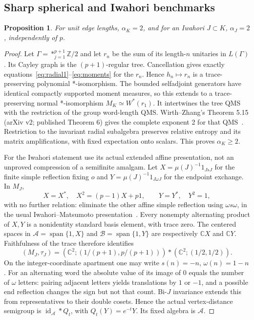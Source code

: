 \documentclass[11pt]{article}
\newtheorem{proposition}[definition]{Proposition}
\theoremstyle{remark}\newtheorem{remark}[definition]{Remark}
\newcommand{\id}{\operatorname{id}}
\newcommand{\C}{\mathbb{C}}
\newcommand{\Z}{\mathbb{Z}}
\begin{document}
\subsection{Sharp spherical and Iwahori benchmarks}
\begin{proposition}\label{prop:sharp}
For unit edge lengths, $\alpha_K=2$, and for an Iwahori $J\subset K$,
$\alpha_J=2$, independently of $p$.
\end{proposition}
\begin{proof}
Let $\Gamma=*_{j=1}^{p+1}\Z/2$ and let $r_n$ be the sum of its length-$n$
unitaries in $L(\Gamma)$. Its Cayley graph is the $(p+1)$-regular tree.
Cancellation gives exactly equations~\eqref{eq:radial1}--\eqref{eq:moments}
for the $r_n$. Hence $h_n\mapsto r_n$ is a trace-preserving polynomial
*-isomorphism. The bounded selfadjoint generators have identical compactly
supported moment measures, so this extends to a trace-preserving normal
*-isomorphism $M_K\simeq W^*(r_1)$. It intertwines the tree QMS with the
restriction of the group word-length QMS. Wirth--Zhang's Theorem 5.15
(arXiv v2; published Theorem 6) gives the complete exponent 2 for that
QMS~\cite{WirthZhang2021}. Restriction to the invariant radial subalgebra
preserves relative entropy and its matrix amplifications, with fixed
expectation onto scalars. This proves $\alpha_K\geq2$.

For the Iwahori statement use its actual extended affine presentation,
not an unproved compression of a semifinite amalgam. Let
$X=\mu(J)^{-1}1_{JsJ}$ for the finite simple reflection fixing $o$ and
$Y=\mu(J)^{-1}1_{J\omega J}$ for the endpoint exchange. In $M_J$,
\[
 X=X^*,\quad X^2=(p-1)X+p1,\qquad Y=Y^*,\quad Y^2=1,
\]
with no further relation: eliminate the other affine simple reflection
using $\omega s\omega$, in the usual Iwahori--Matsumoto presentation~\cite[Sections 7.1--7.2, relations after Lemma 7.2.1]{HainesKottwitzPrasad2010}.
Every nonempty alternating product of $X,Y$ is a nonidentity standard
basis element, with trace zero. The centered spaces in
$\mathcal A=\operatorname{span}\{1,X\}$ and
$\mathcal B=\operatorname{span}\{1,Y\}$ are respectively $\C X$ and
$\C Y$. Faithfulness of the trace therefore identifies
\[
 (M_J,\tau_J)=
 (\C^2;(1/(p+1),p/(p+1))) * (\C^2;(1/2,1/2)).
\]
On the integer-coordinate apartment one may write
$s(n)=-n$, $\omega(n)=1-n$. For an alternating word the absolute value
of its image of 0 equals the number of $\omega$ letters: pairing adjacent
letters yields translations by $1$ or $-1$, and a possible end reflection
changes the sign but not that count. Bi-$J$ invariance extends this from
representatives to their double cosets. Hence the actual vertex-distance
semigroup is $\id_{\mathcal A}*Q_t$, with $Q_t(Y)=e^{-t}Y$.
Its fixed algebra is $\mathcal A$.


\end{proof}
\end{document}
